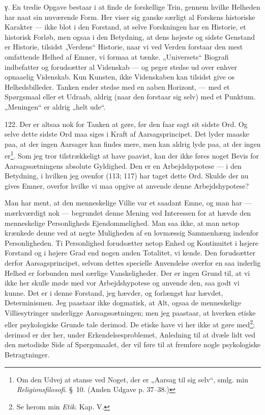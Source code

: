 \documentclass[12pt,a4paper]{book}
\newcommand{\opage}[1]{\marginnote{\footnotesize\textit{[#1]}}}
\begin{document}
γ. En tredie Opgave bestaar i at finde de forskellige Trin, gennem hvilke Helheden
har naat sin nuværende Form. Her viser sig ganske særligt al Forskens historiske
Karakter --- ikke blot i den Forstand, at selve Forskningen har en Historie, et
historisk Forløb, men ogsaa i den Betydning, at dens højeste og sidste Genstand er
Historie, tilsidst „Verdens“ Historie, naar vi ved Verden forstaar den mest
omfattende Helhed af Emner, vi formaa at tænke. „Universets“ Biografi indbefatter og
forudsætter al Videnskab --- og peger stedse ud over enhver opnaaelig Videnskab. Kun
Kunsten, ikke Videnskaben kan tilsidst give os Helhedsbilleder. Tanken ender stedse
med en aaben Horizont, --- med et Spørgsmaal eller et Udraab, aldrig (naar den
forstaar sig selv) med et Punktum. „Meningen“ er aldrig „helt ude“.

122. Der er altsaa nok for Tanken at gøre, før den faar sagt sit sidste Ord. Og
selve dette sidste Ord maa siges i Kraft af Aarsagsprincipet. Det lyder maaske paa,
at der ingen Aarsager kan findes mere, men kan aldrig lyde paa, at der ingen
er\footnote{Om den Udvej at stanse ved Noget, der er „Aarsag til sig selv“, smlg. min
\emph{Religionsfilosofi}. \S\ 10. (Anden Udgave p. 37--38.)}. Som jeg tror
tilstrækkeligt at have paavist, kan der ikke føres noget Bevis for Aarsagssætningens
\opage{291} absolute Gyldighed. Den er en Arbejdshypotese --- i den Betydning, i hvilken jeg
ovenfor (113; 117) har taget dette Ord. Skulde der nu gives Emner, overfor hvilke vi
maa opgive at anvende denne Arbejdshypotese?

Man har ment, at den menneskelige Villie var et saadant Emne, og man har ---
mærkværdigt nok --- begrundet denne Mening ved Interessen for at hævde den
menneskelige Personligheds Ejendommelighed. Man saa ikke, at man netop krænkede denne
ved at negte Muligheden af en lovmæssig Sammenhæng indenfor Personligheden. Ti
Personlighed forudsætter netop Enhed og Kontinuitet i højere Forstand og i højere
Grad end nogen anden Totalitet, vi kende. Den forudsætter derfor Aarsagsprincipet,
selvom dettes specielle Anvendelse overfor en saa inderlig Helhed er forbunden med
særlige Vanskeligheder. Der er ingen Grund til, at vi ikke her skulle møde med vor
Arbejdshypotese og anvende den, saa godt vi kunne. Det er i denne Forstand, jeg
hævder, og forlængst har hævdet, Determinismen. Jeg paastaar ikke dogmatisk, at Alt,
ogsaa de menneskelige Villiesytringer underligge Aarsagssætningen; men jeg paastaar,
at hverken etiske eller psykologiske Grunde tale derimod. De etiske have vi her ikke
at gøre med\footnote{Se herom min \emph{Etik}. Kap. V.}; derimod er der her, under
Erkendelsesproblemet, Anledning til at dvæle lidt ved den metodiske Side af
Spørgsmaalet, der vil føre til at fremføre nogle psykologiske Betragtninger.
\end{document}
